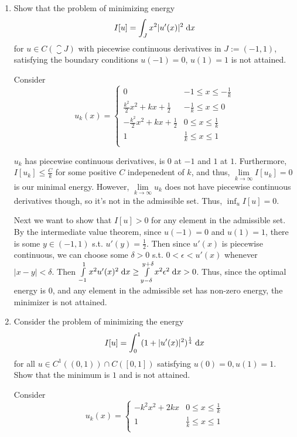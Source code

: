 \begin{enumerate}
\item
  Show that the problem of minimizing energy
  $$
  I[u] = \int_J x^2 |u'(x)|^2 \;\mathrm{d}x
  $$
  for $u \in C(\closure{J})$ with piecewise continuous derivatives in $J := (-1, 1)$,
  satisfying the boundary conditions $u(-1) = 0$, $u(1) = 1$ is not attained.

  Consider
  $$
  u_k(x) =
  \begin{cases}
    0 & -1 \leq x \leq -\frac{1}{k}\\
    \frac{k^2}{2} x^2 + k x + \frac{1}{2} & -\frac{1}{k} \leq x \leq 0\\
    -\frac{k^2}{2} x^2 + k x + \frac{1}{2} & 0 \leq x \leq \frac{1}{k}\\
    1 & \frac{1}{k} \leq x \leq 1\\
  \end{cases}
  $$

  $u_k$ has piecewise continuous derivatives, is $0$ at $-1$ and $1$ at $1$.
  Furthermore, $I[u_k] \leq \frac{C}{k}$ for some positive $C$ indepenedent of $k$,
  and thus, $\lim \limits_{k \rightarrow \infty} I[u_k] = 0$ is our minimal energy.
  However, $\lim \limits_{k \rightarrow \infty} u_k$ does not have piecewise continuous derivatives though, so it's not in the admissible set.
  Thus, $\inf_{u} I[u] = 0$.

  Next we want to show that $I[u] > 0$ for any element in the admissible set.
  By the intermediate value theorem, since $u(-1) = 0$ and $u(1) = 1$, there is some $y \in (-1, 1)$ s.t. $u'(y) = \frac{1}{2}$.
  Then since $u'(x)$ is piecewise continuous, we can choose some $\delta > 0$ s.t. $0 < \epsilon < u'(x)$ whenever $|x - y| < \delta$.
  Then $\int \limits_{-1}^{1} x^2 u'(x)^2 \;\mathrm{d}x \geq \int \limits_{y - \delta}^{y + \delta} x^2 \epsilon^2 \;\mathrm{d}x > 0$.
  Thus, since the optimal energy is $0$, and any element in the admissible set has non-zero energy, the minimizer is not attained.

\item
  Consider the problem of minimizing the energy
  $$
  I[u] = \int_0^1 (1 + |u'(x)|^2)^{\frac{1}{4}} \;\mathrm{d}x
  $$
  for all $u \in C^1((0, 1)) \cap C([0, 1])$ satisfying $u(0) = 0, u(1) = 1$. Show that the minimum is $1$ and is not attained.

  Consider
  $$
  u_k(x) =
  \begin{cases}
    -k^2 x^2 + 2 k x & 0 \leq x \leq \frac{1}{k}\\
    1 & \frac{1}{k} \leq x \leq 1\\
  \end{cases}
  $$


\end{enumerate}
